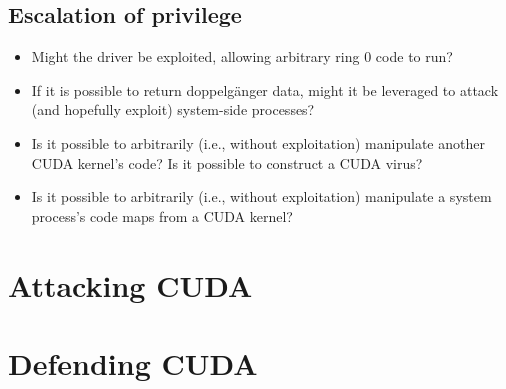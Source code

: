 \documentclass[letterpaper,10pt]{article}
\begin{document}
\begin{multicols}{2}
\subsection{Escalation of privilege}
\begin{itemize}
\item Might the driver be exploited, allowing arbitrary ring 0 code to run?
\item If it is possible to return doppelg\"anger data, might it be leveraged
to attack (and hopefully exploit) system-side processes?
\item Is it possible to arbitrarily (i.e., without exploitation) manipulate
another CUDA kernel's code? Is it possible to construct a CUDA virus?
\item Is it possible to arbitrarily (i.e., without exploitation) manipulate a
system process's code maps from a CUDA kernel?
\end{itemize}

\section{Attacking CUDA}

\section{Defending CUDA}


\end{multicols}
\end{document}
